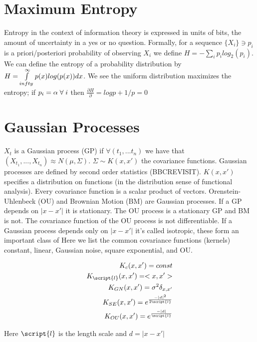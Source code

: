 \section{Maximum Entropy}
Entropy in the context of information theory is expressed in units of bits, the amount of uncertainty in a yes or no question. Formally, for a sequence $ \{X_i\} \ni p_i  $ is a priori/posteriori probability of observing $X_i$ we define $H=- \sum\limits_{i} p_i log_2( p_i) $.  We can define the entropy of a probability distribution by $H=\int\limits_{\-infty}^{\infty} p(x) log( p(x) ) dx $.  We see the uniform distribution maximizes the entropy; if $p_i=\alpha \; \forall \; i$ then $\frac{\partial H}{\partial } = log p +1/p=0 $

\section{Gaussian Processes}
$X_t$ is a Gaussian process (GP) if $\forall (t_1,...t_n)$ we have that $(X_{t_1}, ... ,X_{t_n}) \approx N(\mu, \Sigma)$. $\Sigma \sim K(x,x')$ the covariance functions.  Gaussian processes are defined by second order statistics (BBCREVISIT). $K(x,x')$ specifies a distribution on functions (in the distribution sense of functional analysis). Every covariance function is a scalar product of vectors.  Orenstein-Uhlenbeck (OU) and Brownian Motion (BM) are Gaussian processes. If a GP depends on $|x-x'|$ it is stationary.  The OU process is a stationary GP and BM is not. The covariance function of the OU process is not differentiable.  If a Gaussian process depends only on $|x-x'|$ it's called isotropic, these form an important class of 
Here we list the common covariance functions (kernels) constant, linear, Gaussian noise, square exponential, and OU.
\begin{center}\begin{eqnarray*}
K_c(x,x')= const \\
K_\script{l}(x,x') = <x,x'> \\
K_{GN}(x,x') = \sigma^2 \delta_{x,x'} \\
K_{SE}(x,x') = e^{ \frac{-|d|^2}{2 \script{l}} }\\
K_{OU}(x,x') = e^{ \frac{-|d|}{\script{l}} }
\end{eqnarray*}\end{center}
Here $\script{l}$ is the length scale and $d = |x-x'|$